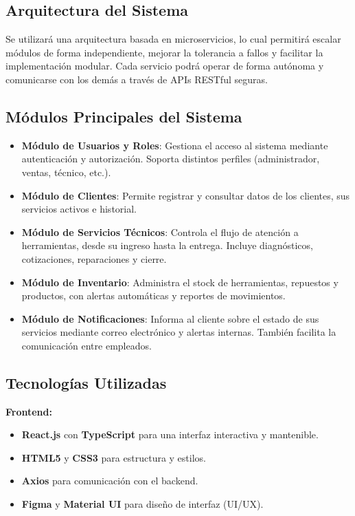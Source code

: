 \subsection{Arquitectura del Sistema}

Se utilizará una arquitectura basada en microservicios, lo cual permitirá escalar módulos de forma independiente, mejorar la tolerancia a fallos y facilitar la implementación modular. Cada servicio podrá operar de forma autónoma y comunicarse con los demás a través de APIs RESTful seguras.

\subsection{Módulos Principales del Sistema}

\begin{itemize}
	\item \textbf{Módulo de Usuarios y Roles}: Gestiona el acceso al sistema mediante autenticación y autorización. Soporta distintos perfiles (administrador, ventas, técnico, etc.).

	\item \textbf{Módulo de Clientes}: Permite registrar y consultar datos de los clientes, sus servicios activos e historial.

	\item \textbf{Módulo de Servicios Técnicos}: Controla el flujo de atención a herramientas, desde su ingreso hasta la entrega. Incluye diagnósticos, cotizaciones, reparaciones y cierre.

	\item \textbf{Módulo de Inventario}: Administra el stock de herramientas, repuestos y productos, con alertas automáticas y reportes de movimientos.

	\item \textbf{Módulo de Notificaciones}: Informa al cliente sobre el estado de sus servicios mediante correo electrónico y alertas internas. También facilita la comunicación entre empleados.
\end{itemize}

\subsection{Tecnologías Utilizadas}

\textbf{Frontend:}
\begin{itemize}
	\item \textbf{React.js} con \textbf{TypeScript} para una interfaz interactiva y mantenible.
	\item \textbf{HTML5} y \textbf{CSS3} para estructura y estilos.
	\item \textbf{Axios} para comunicación con el backend.
	\item \textbf{Figma} y \textbf{Material UI} para diseño de interfaz (UI/UX).
\end{itemize}


